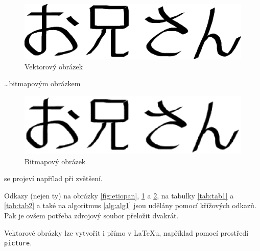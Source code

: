 \documentclass[11pt,a4paper]{article}
\begin{document}
\begin{figure}[h!]
	\begin{center}
		\includegraphics[scale=0.42]{oniisan.eps}
		\caption{Vektorový obrázek} 
		\label{fig:on1}
	\end{center}
\end{figure}
\ldots bitmapovým obrázkem
\begin{figure}[h!]
	\begin{center}
		\includegraphics[scale=0.67]{oniisan2.eps}
		\caption{Bitmapový obrázek} 
		\label{fig:on2}	
	\end{center}
\end{figure}

se projeví napřílad při zvětšení.

Odkazy (nejen ty) na obrázky \ref{fig:etiopan}, \ref{fig:on1} a \ref{fig:on2}, na tabulky \ref{tab:tab1} a \ref{tab:tab2} a také na algoritmus \ref{alg:alg1} jsou udělány pomocí křížových
odkazů. Pak je ovšem potřeba zdrojový soubor přeložit dvakrát.

Vektorové obrázky lze vytvořit i přímo v \LaTeX u, například pomocí prostředí \texttt{picture}.
\end{document}
